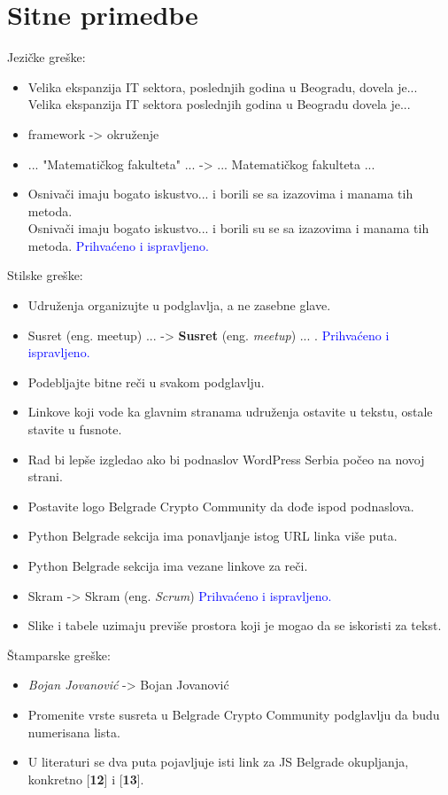 \documentclass[a4paper]{report}
\newcommand{\odgovor}[1]{\textcolor{blue}{#1}}
\begin{document}
\newpage
\section{Sitne primedbe}
Jezičke greške: \begin{itemize}
\item Velika ekspanzija IT sektora, poslednjih godina u Beogradu, dovela je...\\
      Velika ekspanzija IT sektora poslednjih godina u Beogradu dovela je...
\item framework -> okruženje
\item ... "Matematičkog fakulteta" ... -> ... Matematičkog fakulteta ... 
\item Osnivači imaju bogato iskustvo... i borili se sa izazovima i manama tih metoda. \\
      Osnivači imaju bogato iskustvo... i borili su se sa izazovima i manama tih metoda.
       \odgovor{Prihvaćeno i ispravljeno.}
\end{itemize}

Stilske greške:\begin{itemize}
\item Udruženja organizujte u podglavlja, a ne zasebne glave.
\item Susret (eng. meetup) ... -> \textbf{Susret} (eng. \textit{meetup}) ... .
\odgovor{Prihvaćeno i ispravljeno.}
\item Podebljajte bitne reči u svakom podglavlju.
\item Linkove koji vode ka glavnim stranama udruženja ostavite u tekstu, ostale stavite u fusnote.
\item Rad bi lepše izgledao ako bi podnaslov WordPress Serbia počeo na novoj strani.
\item Postavite logo Belgrade Crypto Community da dođe ispod podnaslova.
\item Python Belgrade sekcija ima ponavljanje istog URL linka više puta.
\item Python Belgrade sekcija ima vezane linkove za reči.
\item Skram -> Skram (eng. \textit{Scrum})
\odgovor{Prihvaćeno i ispravljeno.}
\item Slike i tabele uzimaju previše prostora koji je mogao da se iskoristi za tekst.
\end{itemize}

Štamparske greške:\begin{itemize}
\item \textit{Bojan Jovanović} -> Bojan Jovanović
\item Promenite vrste susreta u Belgrade Crypto Community podglavlju da budu numerisana lista.
\item U literaturi se dva puta pojavljuje isti link za JS Belgrade okupljanja, konkretno
      [\textbf{12}] i [\textbf{13}].
\end{itemize}
\end{document}
